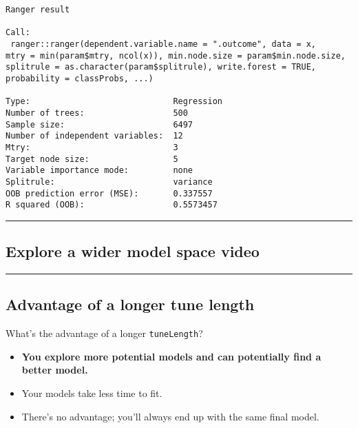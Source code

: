 \documentclass[]{book}
\newenvironment{Shaded}{\begin{snugshade}}{\end{snugshade}}
\newcommand{\OperatorTok}[1]{\textcolor[rgb]{0.81,0.36,0.00}{\textbf{#1}}}
\newcommand{\NormalTok}[1]{#1}
\begin{document}
\begin{Shaded}
\end{Shaded}

\begin{verbatim}
Ranger result

Call:
 ranger::ranger(dependent.variable.name = ".outcome", data = x,      mtry = min(param$mtry, ncol(x)), min.node.size = param$min.node.size,      splitrule = as.character(param$splitrule), write.forest = TRUE,      probability = classProbs, ...) 

Type:                             Regression 
Number of trees:                  500 
Sample size:                      6497 
Number of independent variables:  12 
Mtry:                             3 
Target node size:                 5 
Variable importance mode:         none 
Splitrule:                        variance 
OOB prediction error (MSE):       0.337557 
R squared (OOB):                  0.5573457 
\end{verbatim}

\begin{center}\rule{0.5\linewidth}{\linethickness}\end{center}

\subsection*{Explore a wider model space
video}\label{explore-a-wider-model-space-video}

\begin{center}\rule{0.5\linewidth}{\linethickness}\end{center}

\subsection*{Advantage of a longer tune
length}\label{advantage-of-a-longer-tune-length}

What's the advantage of a longer \texttt{tuneLength}?

\begin{itemize}
\item
  \textbf{You explore more potential models and can potentially find a
  better model.}
\item
  Your models take less time to fit.
\item
  There's no advantage; you'll always end up with the same final model.
\end{itemize}
\end{document}
